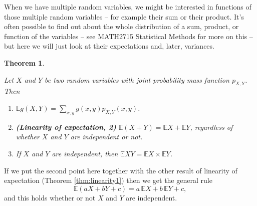 \documentclass[
  a4paper,
]{book}
\providecommand{\tightlist}{%
  \setlength{\itemsep}{0pt}\setlength{\parskip}{0pt}}
\newtheorem{theorem}{Theorem}[chapter]
\theoremstyle{definition}
\theoremstyle{definition}
\theoremstyle{definition}
\theoremstyle{definition}
\theoremstyle{remark}
\begin{document}
When we have multiple random variables, we might be interested in functions of those multiple random variables -- for example their sum or their product. It's often possible to find out about the whole distribution of a sum, product, or function of the variables -- see MATH2715 Statistical Methods for more on this -- but here we will just look at their expectations and, later, variances.

\begin{theorem}
\protect\hypertarget{thm:linearity2}{}\label{thm:linearity2}

Let \(X\) and \(Y\) be two random variables with joint probability mass function \(p_{X,Y}\). Then

\begin{enumerate}
\def\labelenumi{\arabic{enumi}.}
\tightlist
\item
  \(\mathbb Eg(X,Y) = \displaystyle\sum_{x,y} g(x,y) p_{X,Y}(x,y)\).
\item
  \textbf{(Linearity of expectation, 2)} \(\mathbb E(X + Y) = \mathbb EX + \mathbb EY\), regardless of whether \(X\) and \(Y\) are independent or not.
\item
  If \(X\) and \(Y\) are independent, then \(\mathbb EXY = \mathbb EX \times \mathbb EY\).
\end{enumerate}

\end{theorem}

If we put the second point here together with the other result of linearity of expectation (Theorem \ref{thm:linearity1}) then we get the general rule
\[ \mathbb E(aX + bY + c) = a\,\mathbb EX + b \,\mathbb EY + c , \]
and this holds whether or not \(X\) and \(Y\) are independent.
\end{document}
